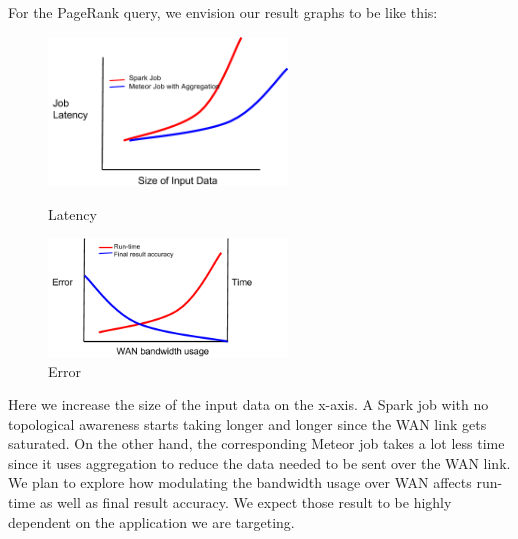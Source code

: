 \newpage
For the PageRank query, we envision our result graphs to be like this:

\begin{figure}[ht]
	\centering
	\begin{minipage}[b]{0.48\linewidth}
		\includegraphics[width=2.5in]{figs/fig_1.png}
		\caption{Latency}
		\label{fig:minipage1}
	\end{minipage}
	\quad
	\begin{minipage}[b]{0.48\linewidth}
		\includegraphics[width=2.5in]{figs/fig_2.png}
		\caption{Error}
		\label{fig:minipage2}
	\end{minipage}
\end{figure}

Here we increase the size of the input data on the x-axis. A Spark job with no topological awareness starts taking longer and longer since the WAN link gets saturated. On the other hand, the corresponding Meteor job takes a lot less time since it uses aggregation to reduce the data needed to be sent over the WAN link. We plan to explore how modulating the bandwidth usage over WAN affects run-time as well as final result accuracy. We expect those result to be highly dependent on the application we are targeting.


